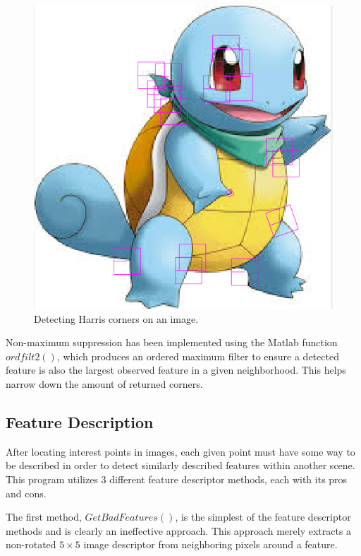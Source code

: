 \documentclass[12pt,journal,compsoc]{IEEEtran}
\begin{document}
\begin{figure}[h]
	\centering
		  \centering
		  \includegraphics[width=1\linewidth]{img/squirtle1}
		  \caption{Detecting Harris corners on an image.}
		  \label{fig:squirtle1}
\end{figure}

Non-maximum suppression has been implemented using the Matlab function $ordfilt2()$, which produces an ordered maximum filter to ensure a detected feature is also the largest observed feature in a given neighborhood. This helps narrow down the amount of returned corners.

\subsection{Feature Description}
After locating interest points in images, each given point must have some way to be described in order to detect similarly described features within another scene. This program utilizes 3 different feature descriptor methods, each with its pros and cons.

The first method, $GetBadFeatures()$, is the simplest of the feature descriptor methods and is clearly an ineffective approach. This approach merely extracts a non-rotated $5 \times 5$ image descriptor from neighboring pixels around a feature.
\end{document}
